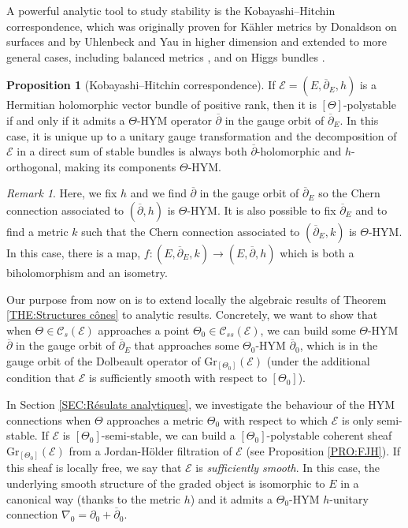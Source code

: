 \documentclass{article}
\theoremstyle{remark}
\newtheorem*{remark}{Remark}
\theoremstyle{definition}
\newtheorem{propositionIntro}[theoremIntro]{Proposition}
\newcommand{\E}{\mathcal{E}}
\newcommand{\Gr}{\mathrm{Gr}}
\newcommand{\dbar}{\overline{\partial}}
\newcommand{\mC}{\mathcal{C}}
\begin{document}
A powerful analytic tool to study stability is the Kobayashi--Hitchin correspondence, which was originally proven for Kähler metrics by Donaldson on surfaces \cite{Donaldson} and by Uhlenbeck and Yau in higher dimension \cite{Uhlenbeck_Yau} and extended to more general cases, including balanced metrics \cite{Li_Yau}, and on Higgs bundles \cite{Lübke_Teleman}.

\begin{propositionIntro}[Kobayashi--Hitchin correspondence]\label{PRO:Kobayashi--Hitchin}
    If $\E = (E,\dbar_E,h)$ is a Hermitian holomorphic vector bundle of positive rank, then it is $[\Theta]$-polystable if and only if it admits a $\Theta$-HYM operator $\dbar$ in the gauge orbit of $\dbar_E$. In this case, it is unique up to a unitary gauge transformation and the decomposition of $\E$ in a direct sum of stable bundles is always both $\dbar$-holomorphic and $h$-orthogonal, making its components $\Theta$-HYM.
\end{propositionIntro}
\begin{remark}
Here, we fix $h$ and we find $\dbar$ in the gauge orbit of $\dbar_E$ so the Chern connection associated to $(\dbar,h)$ is $\Theta$-HYM. It is also possible to fix $\dbar_E$ and to find a metric $k$ such that the Chern connection associated to $(\dbar_E,k)$ is $\Theta$-HYM. In this case, there is a map, $f : (E,\dbar_E,k) \rightarrow (E,\dbar,h)$ which is both a biholomorphism and an isometry.
\end{remark}

Our purpose from now on is to extend locally the algebraic results of Theorem \ref{THE:Structures cônes} to analytic results. Concretely, we want to show that when $\Theta \in \mC_s(\E)$ approaches a point $\Theta_0 \in \mC_{ss}(\E)$, we can build some $\Theta$-HYM $\dbar$ in the gauge orbit of $\dbar_E$ that approaches some $\Theta_0$-HYM $\dbar_0$, which is in the gauge orbit of the Dolbeault operator of $\Gr_{[\Theta_0]}(\E)$ (under the additional condition that $\E$ is sufficiently smooth with respect to $[\Theta_0]$).

In Section \ref{SEC:Résulats analytiques}, we investigate the behaviour of the HYM connections when $\Theta$ approaches a metric $\Theta_0$ with respect to which $\E$ is only semi-stable. If $\E$ is $[\Theta_0]$-semi-stable, we can build a $[\Theta_0]$-polystable coherent sheaf $\Gr_{[\Theta_0]}(\E)$ from a Jordan-Hölder filtration of $\E$ (see Proposition \ref{PRO:FJH}). If this sheaf is locally free, we say that $\E$ is \textit{sufficiently smooth}. In this case, the underlying smooth structure of the graded object is isomorphic to $E$ in a canonical way (thanks to the metric $h$) and it admits a $\Theta_0$-HYM $h$-unitary connection $\nabla_0 = \partial_0 + \dbar_0$.
\end{document}

